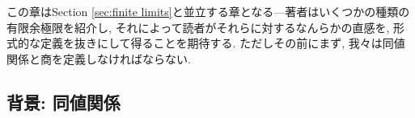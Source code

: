 この章はSection \ref{sec:finite limits}と並立する章となる---著者はいくつかの種類の有限余極限を紹介し, それによって読者がそれらに対するなんらかの直感を, 形式的な定義を抜きにして得ることを期待する. ただしその前にまず, 我々は同値関係と商を定義しなければならない.


\subsection{背景: 同値関係}

